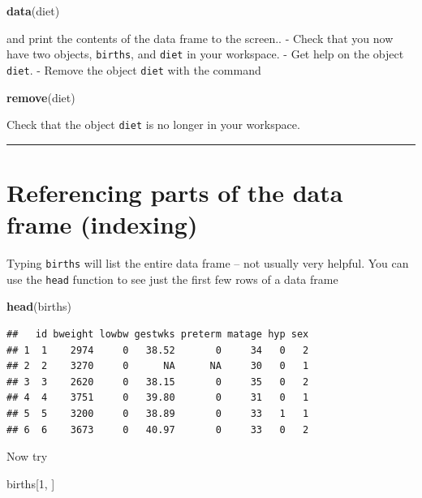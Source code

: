 \documentclass[
]{book}
\newenvironment{Shaded}{\begin{snugshade}}{\end{snugshade}}
\newcommand{\DecValTok}[1]{\textcolor[rgb]{0.00,0.00,0.81}{#1}}
\newcommand{\FunctionTok}[1]{\textcolor[rgb]{0.13,0.29,0.53}{\textbf{#1}}}
\newcommand{\NormalTok}[1]{#1}
\begin{document}
\begin{Shaded}
\begin{Highlighting}[]
\FunctionTok{data}\NormalTok{(diet)}
\end{Highlighting}
\end{Shaded}

and print the contents of the data frame to the screen..
- Check that you now have two objects, \texttt{births}, and \texttt{diet} in your workspace.
- Get help on the object \texttt{diet}.
- Remove the object \texttt{diet} with the command

\begin{Shaded}
\begin{Highlighting}[]
\FunctionTok{remove}\NormalTok{(diet)}
\end{Highlighting}
\end{Shaded}

Check that the object \texttt{diet} is no longer in your workspace.

\begin{center}\rule{0.5\linewidth}{0.5pt}\end{center}

\section{Referencing parts of the data frame (indexing)}\label{referencing-parts-of-the-data-frame-indexing}

Typing \texttt{births} will list the entire data frame -- not usually
very helpful. You can use the \texttt{head} function to see just the
first few rows of a data frame

\begin{Shaded}
\begin{Highlighting}[]
\FunctionTok{head}\NormalTok{(births)}
\end{Highlighting}
\end{Shaded}

\begin{verbatim}
##   id bweight lowbw gestwks preterm matage hyp sex
## 1  1    2974     0   38.52       0     34   0   2
## 2  2    3270     0      NA      NA     30   0   1
## 3  3    2620     0   38.15       0     35   0   2
## 4  4    3751     0   39.80       0     31   0   1
## 5  5    3200     0   38.89       0     33   1   1
## 6  6    3673     0   40.97       0     33   0   2
\end{verbatim}

Now try

\begin{Shaded}
\begin{Highlighting}[]
\NormalTok{births[}\DecValTok{1}\NormalTok{, ]}
\end{Highlighting}
\end{Shaded}
\end{document}

